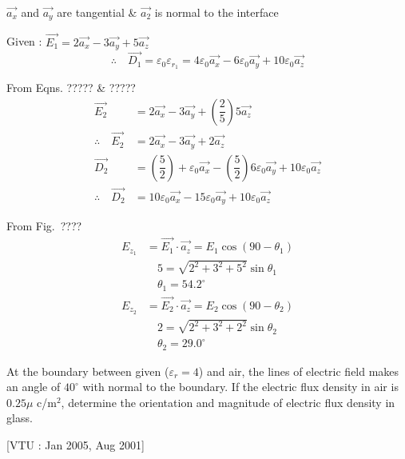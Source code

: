 \begin{solution}
$\overrightarrow{a_{x}}$ and $\overrightarrow{a_{y}}$ are tangential \& $\overrightarrow{a_{2}}$ is normal to the interface

Given : $\overrightarrow{E_{1}} = 2\overrightarrow{a_{x}} - 3\overrightarrow{a_{y}} + 5\overrightarrow{a_{z}}$
$$
\therefore\quad \overrightarrow{D_{1}} = \varepsilon_{0}\varepsilon_{r_{1}} = 4\varepsilon_{0}\overrightarrow{a_{x}} - 6\varepsilon_{0}\overrightarrow{a_{y}} + 10\varepsilon_{0}\overrightarrow{a_{z}}
$$

From Eqns. ????? \& ?????
\begin{align*}
\overrightarrow{E_{2}} & = 2\overrightarrow{a_{x}} - 3\overrightarrow{a_{y}} + \left(\dfrac{2}{5}\right) 5\overrightarrow{a_{z}}\\
\therefore\quad \overrightarrow{E_{2}} & = 2\overrightarrow{a_{x}} - 3\overrightarrow{a_{y}} + 2\overrightarrow{a_{z}}\\
\overrightarrow{D_{2}} & = \left(\dfrac{5}{2}\right) + \varepsilon_{0}\overrightarrow{a_{x}} - \left(\dfrac{5}{2}\right) 6\varepsilon_{0}\overrightarrow{a_{y}} + 10\varepsilon_{0}\overrightarrow{a_{z}}\\
\therefore\quad \overrightarrow{D_{2}} & = 10\varepsilon_{0}\overrightarrow{a_{x}} - 15\varepsilon_{0}\overrightarrow{a_{y}} + 10\varepsilon_{0}\overrightarrow{a_{z}}
\end{align*}

From Fig.~????
\begin{align*}
E_{z_{1}} & = \overrightarrow{E_{1}} \cdot \overrightarrow{a_{z}} = E_{1} \cos (90 - \theta_{1})\\
&\quad 5 = \sqrt{2^{2} + 3^{2} + 5^{2}} \sin \theta_{1}\\
&\quad \theta_{1} = 54.2^{\circ}\\[0.3cm]
E_{z_{2}} & = \overrightarrow{E_{2}} \cdot \overrightarrow{a_{z}} = E_{2} \cos (90 - \theta_{2})\\
&\quad 2 = \sqrt{2^{2} + 3^{2} + 2^{2}} \sin \theta_{2}\\
&\quad \theta_{2} = 29.0^{\circ}
\end{align*}
\end{solution}

\begin{problem}
At the boundary between given ($\varepsilon_{r} = 4$) and air, the lines of electric field makes an angle of $40^{\circ}$ with normal to the boundary. If the electric flux density in air is $0.25 \mu$ c/m$^{2}$, determine the orientation and magnitude of electric flux density in glass. 

\hfill [VTU : Jan 2005, Aug 2001]
\end{problem}


